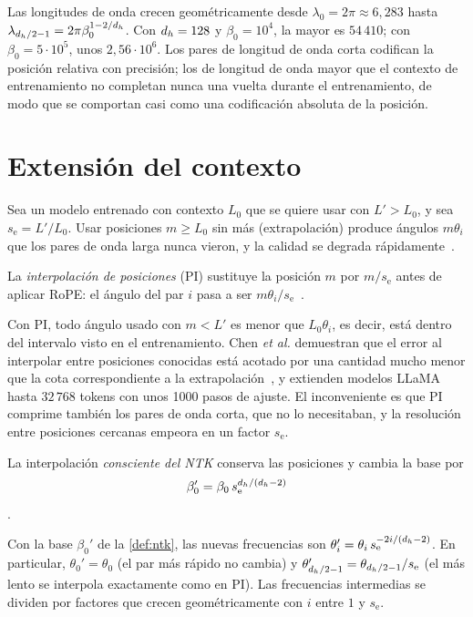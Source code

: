 Las longitudes de onda crecen geométricamente desde $\lambda_0=2\pi\approx 6{,}283$ hasta $\lambda_{d_{h}/2-1}=2\pi\beta_0^{1-2/d_{h}}$. Con $d_{h}=128$ y $\beta_0=10^{4}$, la mayor es $54\,410$; con $\beta_0=5\cdot 10^{5}$, unos $2{,}56\cdot 10^{6}$. Los pares de longitud de onda corta codifican la posición relativa con precisión; los de longitud de onda mayor que el contexto de entrenamiento no completan nunca una vuelta durante el entrenamiento, de modo que se comportan casi como una codificación absoluta de la posición.

\section{Extensión del contexto}

Sea un modelo entrenado con contexto $L_0$ que se quiere usar con $L'>L_0$, y sea $s_{\mathrm{e}}=L'/L_0$. Usar posiciones $m\ge L_0$ sin más (extrapolación) produce ángulos $m\theta_i$ que los pares de onda larga nunca vieron, y la calidad se degrada rápidamente~\cite[§2.2]{pi}.

\begin{definicion}\label{def:pi}
La \emph{interpolación de posiciones} (PI) sustituye la posición $m$ por $m/s_{\mathrm{e}}$ antes de aplicar RoPE: el ángulo del par $i$ pasa a ser $m\theta_i/s_{\mathrm{e}}$~\cite[§2.3, ec.~4]{pi}.
\end{definicion}

Con PI, todo ángulo usado con $m<L'$ es menor que $L_0\theta_i$, es decir, está dentro del intervalo visto en el entrenamiento. Chen \emph{et al.} demuestran que el error al interpolar entre posiciones conocidas está acotado por una cantidad mucho menor que la cota correspondiente a la extrapolación~\cite[§2.3, teorema~2.1]{pi}, y extienden modelos LLaMA hasta $32\,768$ tokens con unos 1000 pasos de ajuste. El inconveniente es que PI comprime también los pares de onda corta, que no lo necesitaban, y la resolución entre posiciones cercanas empeora en un factor $s_{\mathrm{e}}$.

\begin{definicion}\label{def:ntk}
La interpolación \emph{consciente del NTK} conserva las posiciones y cambia la base por
\[
\beta_0'=\beta_0\,s_{\mathrm{e}}^{d_{h}/(d_{h}-2)}
\]
\cite[§3.1]{yarn}.
\end{definicion}

\begin{proposicion}\label{prop:ntk}
Con la base $\beta_0'$ de la \cref{def:ntk}, las nuevas frecuencias son $\theta_i'=\theta_i\,s_{\mathrm{e}}^{-2i/(d_{h}-2)}$. En particular, $\theta_0'=\theta_0$ (el par más rápido no cambia) y $\theta'_{d_{h}/2-1}=\theta_{d_{h}/2-1}/s_{\mathrm{e}}$ (el más lento se interpola exactamente como en PI). Las frecuencias intermedias se dividen por factores que crecen geométricamente con $i$ entre $1$ y $s_{\mathrm{e}}$.
\end{proposicion}

